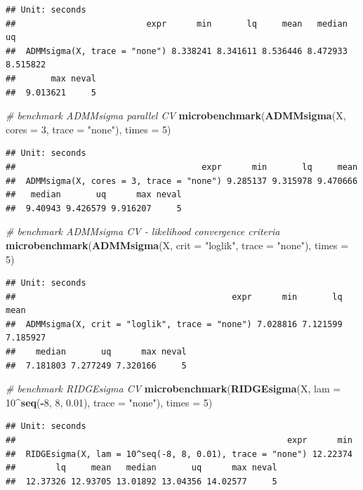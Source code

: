 \documentclass[12pt,]{book}
\newenvironment{Shaded}{\begin{snugshade}}{\end{snugshade}}
\newcommand{\CommentTok}[1]{\textcolor[rgb]{0.56,0.35,0.01}{\textit{#1}}}
\newcommand{\DataTypeTok}[1]{\textcolor[rgb]{0.13,0.29,0.53}{#1}}
\newcommand{\DecValTok}[1]{\textcolor[rgb]{0.00,0.00,0.81}{#1}}
\newcommand{\FloatTok}[1]{\textcolor[rgb]{0.00,0.00,0.81}{#1}}
\newcommand{\KeywordTok}[1]{\textcolor[rgb]{0.13,0.29,0.53}{\textbf{#1}}}
\newcommand{\NormalTok}[1]{#1}
\newcommand{\OperatorTok}[1]{\textcolor[rgb]{0.81,0.36,0.00}{\textbf{#1}}}
\newcommand{\StringTok}[1]{\textcolor[rgb]{0.31,0.60,0.02}{#1}}
\theoremstyle{definition}
\theoremstyle{definition}
\theoremstyle{definition}
\theoremstyle{remark}
\begin{document}
\begin{verbatim}
## Unit: seconds
##                          expr      min       lq     mean   median       uq
##  ADMMsigma(X, trace = "none") 8.338241 8.341611 8.536446 8.472933 8.515822
##       max neval
##  9.013621     5
\end{verbatim}

\begin{Shaded}
\begin{Highlighting}[]
\CommentTok{# benchmark ADMMsigma parallel CV}
\KeywordTok{microbenchmark}\NormalTok{(}\KeywordTok{ADMMsigma}\NormalTok{(X, }\DataTypeTok{cores =} \DecValTok{3}\NormalTok{, }\DataTypeTok{trace =} \StringTok{"none"}\NormalTok{), }\DataTypeTok{times =} \DecValTok{5}\NormalTok{)}
\end{Highlighting}
\end{Shaded}

\begin{verbatim}
## Unit: seconds
##                                     expr      min       lq     mean
##  ADMMsigma(X, cores = 3, trace = "none") 9.285137 9.315978 9.470666
##   median       uq      max neval
##  9.40943 9.426579 9.916207     5
\end{verbatim}

\begin{Shaded}
\begin{Highlighting}[]
\CommentTok{# benchmark ADMMsigma CV - likelihood convergence criteria}
\KeywordTok{microbenchmark}\NormalTok{(}\KeywordTok{ADMMsigma}\NormalTok{(X, }\DataTypeTok{crit =} \StringTok{"loglik"}\NormalTok{, }\DataTypeTok{trace =} \StringTok{"none"}\NormalTok{), }\DataTypeTok{times =} \DecValTok{5}\NormalTok{)}
\end{Highlighting}
\end{Shaded}

\begin{verbatim}
## Unit: seconds
##                                           expr      min       lq     mean
##  ADMMsigma(X, crit = "loglik", trace = "none") 7.028816 7.121599 7.185927
##    median       uq      max neval
##  7.181803 7.277249 7.320166     5
\end{verbatim}

\begin{Shaded}
\begin{Highlighting}[]
\CommentTok{# benchmark RIDGEsigma CV}
\KeywordTok{microbenchmark}\NormalTok{(}\KeywordTok{RIDGEsigma}\NormalTok{(X, }\DataTypeTok{lam =} \DecValTok{10}\OperatorTok{^}\KeywordTok{seq}\NormalTok{(}\OperatorTok{-}\DecValTok{8}\NormalTok{, }\DecValTok{8}\NormalTok{, }\FloatTok{0.01}\NormalTok{), }\DataTypeTok{trace =} \StringTok{"none"}\NormalTok{), }\DataTypeTok{times =} \DecValTok{5}\NormalTok{)}
\end{Highlighting}
\end{Shaded}

\begin{verbatim}
## Unit: seconds
##                                                      expr      min
##  RIDGEsigma(X, lam = 10^seq(-8, 8, 0.01), trace = "none") 12.22374
##        lq     mean   median       uq      max neval
##  12.37326 12.93705 13.01892 13.04356 14.02577     5
\end{verbatim}


\end{document}
